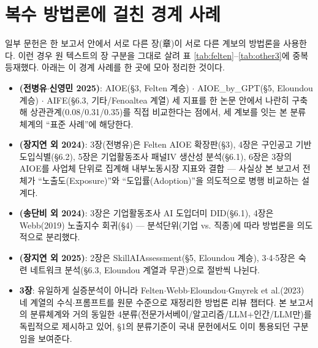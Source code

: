 \documentclass[11pt]{article}
\begin{document}
\section{복수 방법론에 걸친 경계 사례}\label{sec:boundary}

일부 문헌은 한 보고서 안에서 서로 다른 장(章)이 서로 다른 계보의 방법론을 사용한다. 이런 경우 원 텍스트의 장 구분을 그대로 살려 표 \ref{tab:felten}--\ref{tab:other3}에 중복 등재했다. 아래는 이 경계 사례를 한 곳에 모아 정리한 것이다.

\begin{itemize}
  \item \textbf{\citet{cheon-2025-ai-exposure-vs-ai-adoption}(전병유$\cdot$신영민 2025)}: AIOE(\S3, Felten 계승) $\cdot$ AIOE\_by\_GPT(\S5, Eloundou 계승) $\cdot$ AIFE(\S6.3, 기타/Fenoaltea 계열) 세 지표를 한 논문 안에서 나란히 구축해 상관관계(0.08/0.31/0.35)를 직접 비교한다는 점에서, 세 계보를 잇는 본 분류체계의 ``표준 사례''에 해당한다.
  \item \textbf{\citet{chang-2024-ai-development-employment-effects}(장지연 외 2024)}: 3장(전병유)은 Felten AIOE 확장판(\S3), 4장은 구인공고 기반 도입식별(\S6.2), 5장은 기업활동조사 패널IV 생산성 분석(\S6.1), 6장은 3장의 AIOE를 사업체 단위로 집계해 내부노동시장 지표와 결합 --- 사실상 본 보고서 전체가 ``노출도(Exposure)''와 ``도입률(Adoption)''을 의도적으로 병행 비교하는 설계다.
  \item \textbf{\citet{kiet-2024-ai-labor-market-industry}(송단비 외 2024)}: 3장은 기업활동조사 AI 도입더미 DID(\S6.1), 4장은 Webb(2019) 노출지수 회귀(\S4) --- 분석단위(기업 vs. 직종)에 따라 방법론을 의도적으로 분리했다.
  \item \textbf{\citet{chang-2025-ai-era-skills}(장지연 외 2025)}: 2장은 SkillAIAssessment(\S5, Eloundou 계승), 3$\cdot$4$\cdot$5장은 숙련 네트워크 분석(\S6.3, Eloundou 계열과 무관)으로 절반씩 나뉜다.
  \item \textbf{\citet{lee-2024-generative-ai-labor-market-measurement} 3장}: 유일하게 실증분석이 아니라 Felten$\cdot$Webb$\cdot$Eloundou$\cdot$Gmyrek et al.(2023) 네 계열의 수식$\cdot$프롬프트를 원문 수준으로 재정리한 방법론 리뷰 챕터다. 본 보고서의 분류체계와 거의 동일한 4분류(전문가서베이/알고리즘/LLM+인간/LLM만)를 독립적으로 제시하고 있어, \S1의 분류기준이 국내 문헌에서도 이미 통용되던 구분임을 보여준다.
\end{itemize}

\end{document}
